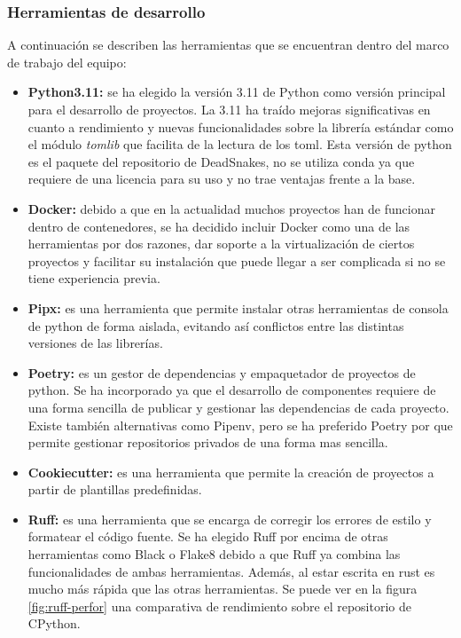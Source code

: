 \subsubsection{Herramientas de desarrollo}
A continuación se describen las herramientas que se encuentran dentro del marco
de trabajo del equipo:
\begin{itemize}
    \item \textbf{Python3.11:} se ha elegido la versión 3.11 de Python como versión
    principal para el desarrollo de proyectos. La 3.11 ha traído mejoras significativas
    en cuanto a rendimiento y nuevas funcionalidades sobre la librería estándar como
    el módulo \textit{tomlib} que facilita de la lectura de los toml. Esta versión
    de python es el paquete del repositorio de DeadSnakes, no se utiliza conda ya
    que requiere de una licencia para su uso y no trae ventajas frente a la base.
    \item \textbf{Docker:} debido a que en la actualidad muchos proyectos han de funcionar
    dentro de contenedores, se ha decidido incluir Docker como una de las herramientas por
    dos razones, dar soporte a la virtualización de ciertos proyectos y facilitar su instalación
    que puede llegar a ser complicada si no se tiene experiencia previa.
    \item \textbf{Pipx:} es una herramienta que permite instalar otras herramientas de 
    consola de python de forma aislada, evitando así conflictos entre las distintas 
    versiones de las librerías.
    \item \textbf{Poetry:} es un gestor de dependencias y empaquetador de proyectos de python.
    Se ha incorporado ya que el desarrollo de componentes requiere de una forma sencilla de
    publicar y gestionar las dependencias de cada proyecto. Existe también alternativas como
    Pipenv, pero se ha preferido Poetry por que permite gestionar repositorios privados de una
    forma mas sencilla.  
    \item \textbf{Cookiecutter:} es una herramienta que permite la creación de proyectos a partir
    de plantillas predefinidas. 
    \item \textbf{Ruff:} es una herramienta que se encarga de corregir los errores de estilo
    y formatear el código fuente. Se ha elegido Ruff por encima de otras herramientas como
    Black o Flake8 debido a que Ruff ya combina las funcionalidades de ambas herramientas. Además,
    al estar escrita en rust es mucho más rápida que las otras herramientas. Se puede ver en la 
    figura \ref{fig:ruff-perfor} una comparativa de rendimiento \cite{astralRuff} sobre el repositorio de CPython.

\end{itemize}
